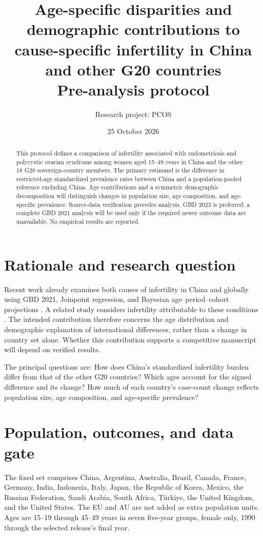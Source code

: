 \documentclass[11pt,a4paper]{article}
\title{\textbf{Age-specific disparities and demographic contributions to cause-specific infertility in China and other G20 countries}\\[6pt]\large Pre-analysis protocol}
\author{Research project: PCOS}
\date{25 October 2026}
\begin{document}
\maketitle
\begin{center}
\end{center}
\begin{abstract}
This protocol defines a comparison of infertility associated with endometriosis and polycystic ovarian syndrome among women aged 15--49 years in China and the other 18 G20 sovereign-country members. The primary estimand is the difference in restricted-age standardized prevalence rates between China and a population-pooled reference excluding China. Age contributions and a symmetric demographic decomposition will distinguish changes in population size, age composition, and age-specific prevalence. Source-data verification precedes analysis. GBD 2023 is preferred; a complete GBD 2021 analysis will be used only if the required newer outcome data are unavailable. No empirical results are reported.
\end{abstract}
\section{Rationale and research question}
Recent work already examines both causes of infertility in China and globally using GBD 2021, Joinpoint regression, and Bayesian age--period--cohort projections \cite{lu}. A related study considers infertility attributable to these conditions \cite{xu}. The intended contribution therefore concerns the age distribution and demographic explanation of international differences, rather than a change in country set alone. Whether this contribution supports a competitive manuscript will depend on verified results.

The principal questions are: How does China's standardized infertility burden differ from that of the other G20 countries? Which ages account for the signed difference and its change? How much of each country's case-count change reflects population size, age composition, and age-specific prevalence?

\section{Population, outcomes, and data gate}
The fixed set comprises China, Argentina, Australia, Brazil, Canada, France, Germany, India, Indonesia, Italy, Japan, the Republic of Korea, Mexico, the Russian Federation, Saudi Arabia, South Africa, T\"urkiye, the United Kingdom, and the United States. The EU and AU are not added as extra population units. Ages are 15--19 through 45--49 years in seven five-year groups, female only, 1990 through the selected release's final year.
\end{document}
